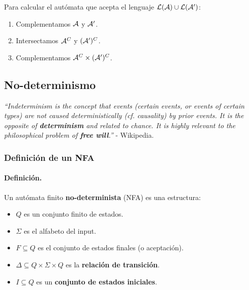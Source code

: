 Para calcular el autómata que acepta el lenguaje $\mathcal{L}(\mathcal{A}) \cup \mathcal{L}(\mathcal{A}')$:
\begin{enumerate}
    \item Complementamos $\mathcal{A}$ y $\mathcal{A}'$.
    \item Intersectamos $\mathcal{A}^C$ y $(\mathcal{A}')^C$.
    \item Complementamos $\mathcal{A}^C \times (\mathcal{A}')^C$.
\end{enumerate}

\subsection{No-determinismo}

\textit{``Indeterminism is the concept that events (certain events, or events of certain types) are not caused deterministically (cf.  causality) by prior events. It is the opposite of \textbf{determinism} and related to chance. It is highly relevant to the philosophical problem of \textbf{free will}.''} - Wikipedia.

\subsubsection{Definición de un NFA}

\paragraph{Definición.} Un autómata finito \textbf{no-determinista} (NFA) es una estructura:
\begin{itemize}
    \item $Q$ es un conjunto finito de estados.
    \item $\Sigma$ es el alfabeto del input.
    \item $F \subseteq Q$ es el conjunto de estados finales (o aceptación).
    \item $\Delta \subseteq Q \times \Sigma \times Q$ es la \textbf{relación de transición}.
    \item $I \subseteq Q$ es un \textbf{conjunto de estados iniciales}.
\end{itemize}


